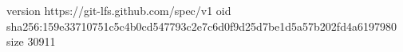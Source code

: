 version https://git-lfs.github.com/spec/v1
oid sha256:159e33710751c5c4b0cd547793c2e7c6d0f9d25d7be1d5a57b202fd4a6197980
size 30911
